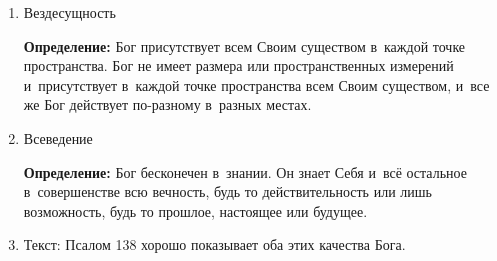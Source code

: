 \documentclass[a4paper,12pt]{article}
\begin{document}
\begin{enumerate}
    \item Вездесущность 
    
\textbf{Определение:} Бог присутствует всем Своим существом в~каждой точке пространства. Бог не имеет размера или пространственных измерений и~присутствует в~каждой точке пространства всем Своим существом, и~все же Бог действует по-разному в~разных местах.

    \item Всеведение 

\textbf{Определение:} Бог бесконечен в~знании. Он знает Себя и~всё остальное в~совершенстве всю вечность, будь то действительность или лишь возможность, будь то прошлое, настоящее или будущее.

    \item Текст: Псалом 138 хорошо показывает оба этих качества Бога. 
\end{enumerate}
\end{document}
